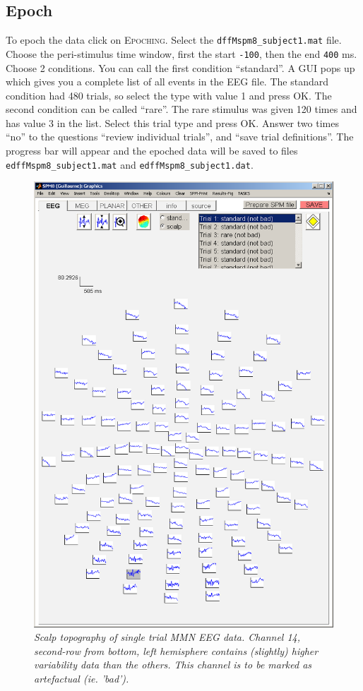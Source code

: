 \subsection{Epoch}
To epoch the data click on \textsc{Epoching}. Select the \texttt{dffMspm8\_subject1.mat} file. Choose the peri-stimulus time window, first the start \texttt{-100}, then the end \texttt{400} ms. Choose 2 conditions. You can call the first condition ``standard''. A GUI pops up which gives you a complete list of all events in the EEG file. The standard condition had 480 trials, so select the type with value 1 and press OK. The second condition can be called ``rare''. The rare stimulus was given 120 times and has value 3 in the list. Select this trial type and press OK. Answer two times ``no'' to the questions  ``review individual trials'', and ``save trial definitions''. The progress bar will appear and the epoched data will be saved to files \texttt{edffMspm8\_subject1.mat} and \texttt{edffMspm8\_subject1.dat}.
\begin{figure}
\begin{center}
\includegraphics[width=150mm]{mmn/topo1}
\caption{\em Scalp topography of single trial MMN EEG data. Channel 14, second-row from bottom, left hemisphere contains (slightly) higher variability data than the others. This channel is to be marked as artefactual (ie. 'bad').
\label{topo1}}
\end{center}
\end{figure}

